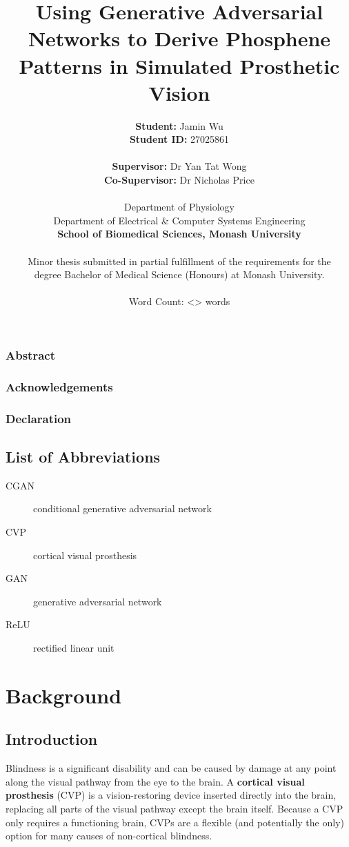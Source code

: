 \documentclass[11pt]{book}
\author{\textbf{Student:} Jamin Wu \\ \textbf{Student ID:} 27025861 \\ \\ \textbf{Supervisor:} Dr Yan Tat Wong \\ \textbf{Co-Supervisor:} Dr Nicholas Price \\ \\ Department of Physiology \\ Department of Electrical \& Computer Systems Engineering \\ \textbf{School of Biomedical Sciences, Monash University} \\ \\ Minor thesis submitted in partial fulfillment of the requirements for the \\ degree Bachelor of Medical Science (Honours) at Monash University. \\ \\ Word Count: <> words}
\date{}
\title{\textbf{Using Generative Adversarial Networks to Derive Phosphene Patterns in Simulated Prosthetic Vision}}
\begin{document}
\maketitle
\clearpage

\section*{Abstract}

\clearpage

\section*{Acknowledgements}

\clearpage

\section*{Declaration}

\clearpage

\setcounter{tocdepth}{3}
\tableofcontents

\chapter*{List of Abbreviations}

\begin{description}
\item[{CGAN}] conditional generative adversarial network
\item[{CVP}] cortical visual prosthesis
\item[{GAN}] generative adversarial network
\item[{ReLU}] rectified linear unit
\end{description}

\listoftables
\listoffigures

\part{Background}
\label{sec:org8ef7dd2}
\chapter{Introduction}
\label{sec:org00ab7df}

Blindness is a significant disability and can be caused by damage at any point along the visual pathway from the eye to the brain.
A \textbf{cortical visual prosthesis} (CVP) is a vision-restoring device inserted directly into the brain, replacing all parts of the visual pathway except the brain itself.
Because a CVP only requires a functioning brain, CVPs are a flexible (and potentially the only) option for many causes of non-cortical blindness.
\end{document}
